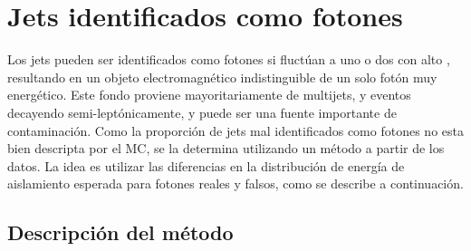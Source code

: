 %




\section{Jets identificados como fotones} \label{sec:jetfakes}

Los jets pueden ser identificados como fotones si fluctúan a uno o dos
{\pizero} con alto \pt, resultando en un objeto electromagnético indistinguible
de un solo fotón muy energético. Este fondo proviene mayoritariamente de
multijets, {\wjets} y eventos {\ttbar} decayendo semi-leptónicamente, y puede
ser una fuente importante de contaminación. Como la proporción de jets mal
identificados como fotones no esta bien descripta por el MC, se la determina
utilizando un método a partir de los datos. La idea es utilizar las diferencias
en la distribución de energía de aislamiento esperada para fotones reales y
falsos, como se describe a continuación.

\subsection{Descripción del método}

